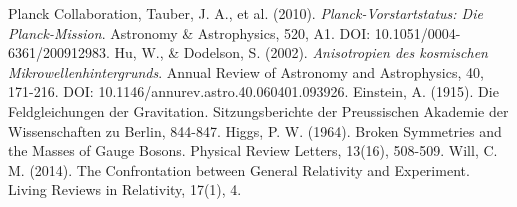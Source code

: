 \documentclass[12pt,a4paper]{article}
\begin{document}
\begin{thebibliography}{99}
		 Planck Collaboration, Tauber, J. A., et al. (2010). \textit{Planck-Vorstartstatus: Die Planck-Mission}. Astronomy \& Astrophysics, 520, A1. DOI: 10.1051/0004-6361/200912983.
		 Hu, W., \& Dodelson, S. (2002). \textit{Anisotropien des kosmischen Mikrowellenhintergrunds}. Annual Review of Astronomy and Astrophysics, 40, 171-216. DOI: 10.1146/annurev.astro.40.060401.093926.
		 Einstein, A. (1915). Die Feldgleichungen der Gravitation. Sitzungsberichte der Preussischen Akademie der Wissenschaften zu Berlin, 844-847.
		 Higgs, P. W. (1964). Broken Symmetries and the Masses of Gauge Bosons. Physical Review Letters, 13(16), 508-509.
		 Will, C. M. (2014). The Confrontation between General Relativity and Experiment. Living Reviews in Relativity, 17(1), 4.
	\end{thebibliography}
	
\end{document}
